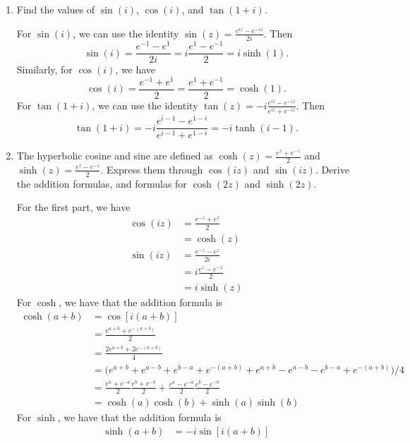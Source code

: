 \begin{enumerate}
\item
  Find the values of \(\sin(i)\), \(\cos(i)\), and \(\tan(1 + i)\).
  \par\smallskip
  For \(\sin(i)\), we can use the identity
  \(\sin(z) = \frac{e^{iz} - e^{-iz}}{2i}\).
  Then
  \[
  \sin(i) = \frac{e^{-1} - e^{1}}{2i} = i\frac{e^{1} - e^{-1}}{2} = i\sinh(1).
  \]
  Similarly, for \(\cos(i)\), we have
  \[
  \cos(i) = \frac{e^{-1} + e^{1}}{2} = \frac{e^{1} + e^{-1}}{2} = \cosh(1).
  \]
  For \(\tan(1 + i)\), we can use the identity
  \(\tan(z) = -i\frac{e^{iz} - e^{-iz}}{e^{iz} + e^{-iz}}\).
  Then
  \[
  \tan(1 + i) = -i\frac{e^{i - 1} - e^{1 - i}}{e^{i - 1} + e^{1 - i}} =
  -i\tanh(i - 1).
  \]
\item
  The hyperbolic cosine and sine are defined as
  \(\cosh(z) = \frac{e^z + e^{-z}}{2}\) and
  \(\sinh(z) = \frac{e^z - e^{-z}}{2}\).
  Express them through \(\cos(iz)\) and \(\sin(iz)\).
  Derive the addition formulas, and formulas for \(\cosh(2z)\) and
  \(\sinh(2z)\).
  \par\smallskip
  For the first part, we have
  \begin{align*}
    \cos(iz) & = \frac{e^{-z} + e^z}{2}\\
             & = \cosh(z)\\
    \sin(iz) & = \frac{e^{-z} - e^z}{2i}\\
             & = i\frac{e^z - e^{-z}}{2}\\
             & = i\sinh(z)
  \end{align*}
  For \(\cosh\), we have that the addition formula is
  \begin{align*}
    \cosh(a + b) & = \cos[i(a + b)]\\
                 & = \frac{e^{a + b} + e^{-(a + b)}}{2}\\
                 & = \frac{2e^{a + b} + 2e^{-(a + b)}}{4}\\
                 & = \bigl(e^{a + b} + e^{a - b} + e^{b - a} + e ^{-(a + b)} +
                   e^{a + b} - e^{a - b} - e^{b - a} + e^{-(a + b)}\bigr)/4\\
                 & = \frac{e^a + e^{-a}}{2}\frac{e^b + e^{-b}}{2} +
                   \frac{e^a - e^{-a}}{2}\frac{e^b - e^{-b}}{2}\\
                 & = \cosh(a)\cosh(b) + \sinh(a)\sinh(b)
  \end{align*}
  For \(\sinh\), we have that the addition formula is
  \begin{align*}
    \sinh(a + b) & = -i\sin[i(a + b)]\\

\end{align*}
\end{enumerate}
